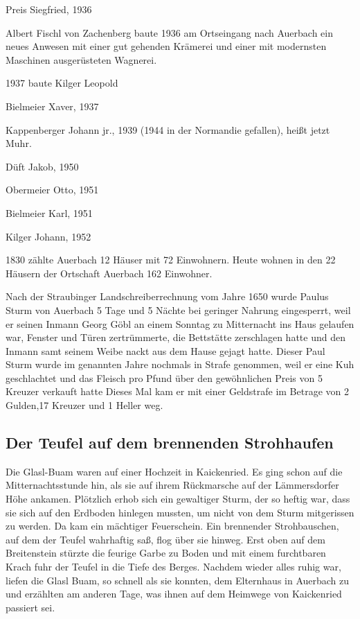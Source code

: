 \documentclass{book}
\begin{document}
Preis Siegfried, 1936

Albert Fischl von Zachenberg baute 1936 am Ortseingang nach Auerbach ein neues
Anwesen mit einer gut gehenden Krämerei und einer mit modernsten Maschinen
ausgerüsteten Wagnerei.

1937 baute Kilger Leopold

Bielmeier Xaver, 1937

Kappenberger Johann jr., 1939 (1944 in der Normandie gefallen), heißt jetzt
Muhr.

Düft Jakob, 1950

Obermeier Otto, 1951

Bielmeier Karl, 1951

Kilger Johann, 1952



1830 zählte Auerbach 12 Häuser mit 72 Einwohnern. Heute wohnen in den 22 Häusern
der Ortschaft Auerbach 162 Einwohner.

Nach der Straubinger Landschreiberrechnung vom Jahre 1650 wurde Paulus Sturm von
Auerbach 5 Tage und 5 Nächte bei geringer Nahrung eingesperrt, weil er seinen
Inmann Georg Göbl an einem Sonntag zu Mitternacht ins Haus gelaufen war, Fenster
und Türen zertrümmerte, die Bettstätte zerschlagen hatte und den Inmann samt
seinem Weibe nackt aus dem Hause gejagt hatte. Dieser Paul Sturm wurde im
genannten Jahre nochmals in Strafe genommen, weil er eine Kuh geschlachtet und
das Fleisch pro Pfund über den gewöhnlichen Preis von 5 Kreuzer verkauft hatte
Dieses Mal kam er mit einer Geldstrafe im Betrage von 2 Gulden,17 Kreuzer und 1
Heller weg.

\subsection{Der Teufel auf dem brennenden Strohhaufen}

Die Glasl-Buam waren auf einer Hochzeit in Kaickenried. Es ging schon auf die
Mitternachtsstunde hin, als sie auf ihrem Rückmarsche auf der Lämmersdorfer Höhe
ankamen. Plötzlich erhob sich ein gewaltiger Sturm, der so heftig war, dass sie
sich auf den Erdboden hinlegen mussten, um nicht von dem Sturm mitgerissen zu
werden. Da kam ein mächtiger Feuerschein. Ein brennender Strohbauschen, auf dem
der Teufel wahrhaftig saß, flog über sie hinweg. Erst oben auf dem Breitenstein
stürzte die feurige Garbe zu Boden und mit einem furchtbaren Krach fuhr der
Teufel in die Tiefe des Berges. Nachdem wieder alles ruhig war, liefen die Glasl
Buam, so schnell als sie konnten, dem Elternhaus in Auerbach zu und erzählten am
anderen Tage, was ihnen auf dem Heimwege von Kaickenried passiert sei.
\end{document}

